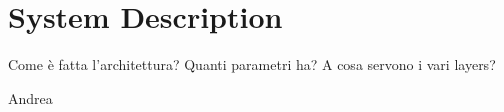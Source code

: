 \chapter{System Description}
    Come è fatta l'architettura?
    Quanti parametri ha?
    A cosa servono i vari layers?

    Andrea